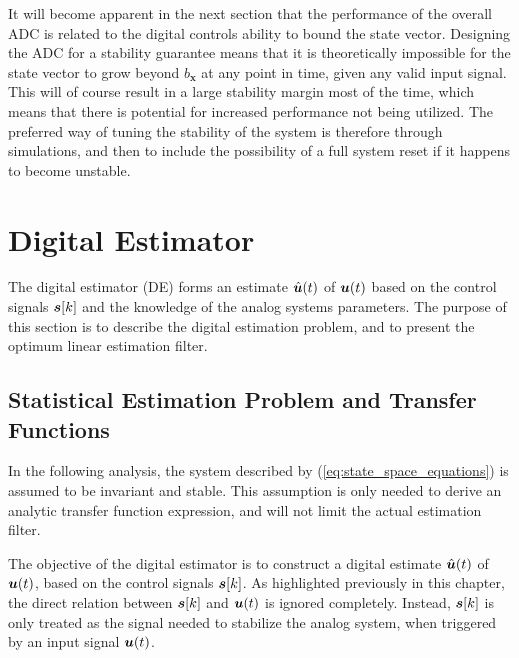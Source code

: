 It will become apparent in the next section that the performance of the overall ADC is related to the digital controls ability to bound the state vector. Designing the ADC for a stability guarantee means that it is theoretically impossible for the state vector to grow beyond $b_{\bm{x}}$ at any point in time, given any valid input signal. This will of course result in a large stability margin most of the time, which means that there is potential for increased performance not being utilized. The preferred way of tuning the stability of the system is therefore through simulations, and then to include the possibility of a full system reset if it happens to become unstable.




















\section{Digital Estimator}
The digital estimator (DE) forms an estimate $\hat{\bm{u}}(t)$ of $\bm{u}(t)$ based on the control signals $\bm{s}[k]$ and the knowledge of the analog systems parameters. The purpose of this section is to describe the digital estimation problem, and to present the optimum linear estimation filter.

\subsection{Statistical Estimation Problem and Transfer Functions}
In the following analysis, the system described by (\ref{eq:state_space_equations}) is assumed to be invariant and stable. This assumption is only needed to derive an analytic transfer function expression, and will not limit the actual estimation filter.

The objective of the digital estimator is to construct a digital estimate $\hat{\bm{u}}(t)$ of $\bm{u}(t)$, based on the control signals $\bm{s}[k]$. As highlighted previously in this chapter, the direct relation between $\bm{s}[k]$ and $\bm{u}(t)$ is ignored completely. Instead, $\bm{s}[k]$ is only treated as the signal needed to stabilize the analog system, when triggered by an input signal $\bm{u}(t)$.

